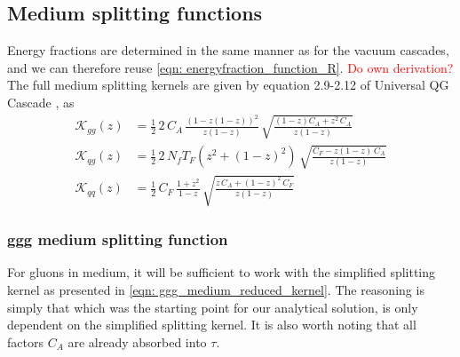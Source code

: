 \documentclass[main.tex]{subfiles}
\begin{document}
\subsection{Medium splitting functions}
Energy fractions are determined in the same manner as for the vacuum cascades, and we can therefore reuse \autoref{eqn: energyfraction_function_R}. 
\textcolor{red}{Do own derivation?}
The full medium splitting kernels are given by equation 2.9-2.12 of Universal QG Cascade  \cite{Universal_quark_gluon_ratio_in_medium-induced_parton_cascade}, as 
\begin{align}
    \mathcal{K}_{gg}(z) &= \frac{1}{2} \, 2\, C_A \, \frac{(1-z(1-z))^2}{z(1-z)} \, \sqrt{\frac{(1-z)C_A + z^2 \, C_A}{z(1-z)}}  \label{eqn: medium_ggg_splittingfunction} \\
    \mathcal{K}_{qg}(z) &= \frac{1}{2} \, 2\, N_f T_F \left(z^2 + (1-z)^2 \right) \, \sqrt{\frac{C_F - z(1-z) \, C_A}{z(1-z)}} \label{eqn: medium_qgg_splittingfunction} \\
    \mathcal{K}_{qq}(z) &= \frac{1}{2} \, C_F \, \frac{1+z^2}{1-z} \, \sqrt{\frac{z\, C_A + (1-z)^2 \, C_F}{z(1-z)}} \label{eqn: medium_qqg_splittingfunction}
\end{align}

\subsubsection{ggg medium splitting function}
For gluons in medium, it will be sufficient to work with the simplified splitting kernel as presented in \autoref{eqn: ggg_medium_reduced_kernel}. The reasoning is simply that \label{eqn: BDMPS_solution_startingpoint} which was the starting point for our analytical solution, is only dependent on the simplified splitting kernel.
It is also worth noting that all factors \(C_A\) are already absorbed into \(\tau\).
\end{document}
